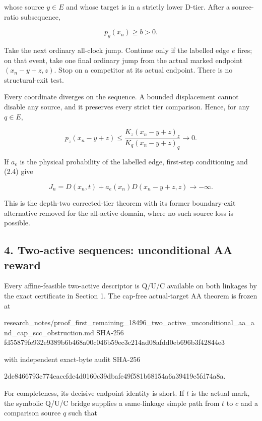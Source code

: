 whose source \(y\in E\) and whose target is in a strictly lower D-tier.
After a source-ratio subsequence,

\[
                     p_y(x_n)\ge b>0.                \tag{3.2}
\]

Take the next ordinary all-clock jump. Continue only if the labelled
edge \(e\) fires; on that event, take one final ordinary jump from the
actual marked endpoint \((x_n-y+z,z)\). Stop on a competitor at its
actual endpoint. There is no structural-exit test.

Every coordinate diverges on the sequence. A bounded displacement cannot
disable any source, and it preserves every strict tier comparison.
Hence, for any \(q\in E\),

\[
 p_z(x_n-y+z)
 \le \frac{K_z(x_n-y+z)_z}{K_q(x_n-y+z)_q}
 \longrightarrow0.                                  \tag{3.3}
\]

If \(a_e\) is the physical probability of the labelled edge, first-step
conditioning and (2.4) give

\[
 J_n=D(x_n,t)+a_e(x_n)D(x_n-y+z,z)\longrightarrow-\infty. \tag{3.4}
\]

This is the depth-two corrected-tier theorem with its former
boundary-exit alternative removed for the all-active domain, where no
such source loss is possible.

\subsection{4. Two-active sequences: unconditional AA
reward}

Every affine-feasible two-active descriptor is Q/U/C available on both
linkages by the exact certificate in Section 1. The cap-free
actual-target AA theorem is frozen at

\begin{CodeBlock}
research_notes/proof_first_remaining_18496_two_active_unconditional_aa_and_cap_scc_obstruction.md
SHA-256 fd55879fe932e9389b6b468a00c046b59ec3c214ad08afdd0eb696b3f42844e3
\end{CodeBlock}

with independent exact-byte audit SHA-256

\begin{CodeBlock}
2de8466793c774eaccfde4d0160c39dbafe49f581b68154a6a39419e5fd74a8a.
\end{CodeBlock}

For completeness, its decisive endpoint identity is short. If \(t\) is
the actual mark, the symbolic Q/U/C bridge supplies a same-linkage
simple path from \(t\) to \(c\) and a comparison source \(q\) such that

